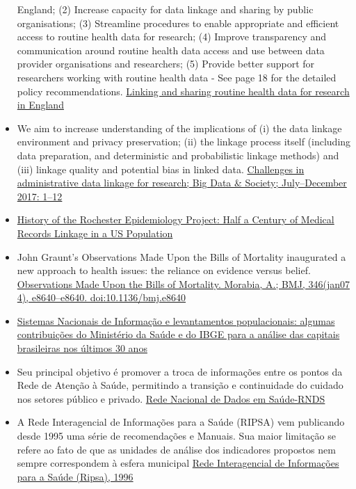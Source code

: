 \documentclass[]{book}
\begin{document}
\begin{itemize}
  England; (2) Increase capacity for data linkage and sharing by public organisations; (3) Streamline procedures to enable appropriate and efficient access to routine health data for research; (4) Improve transparency and communication around routine health data access and use between data provider organisations and researchers; (5) Provide better support for researchers working with routine health data - See page 18 for the detailed policy recommendations. \href{https://www.phgfoundation.org/documents/PHGF-linking-and-sharing-routine-health-data-for-research-in-england.pdf}{Linking and sharing routine health data for research in England}
\item
  We aim to increase understanding of the implications of (i) the data linkage environment and privacy preservation; (ii) the linkage process itself (including data preparation, and deterministic and probabilistic linkage methods) and (iii) linkage quality and potential bias in linked data. \href{https://journals.sagepub.com/doi/pdf/10.1177/2053951717745678}{Challenges in administrative data linkage for research; Big Data \& Society; July--December 2017: 1--12}
\item
  \href{https://sci-hub.tw/10.1016/j.mayocp.2012.08.012}{History of the Rochester Epidemiology Project: Half a Century of Medical Records Linkage in a US Population}
\item
  John Graunt's Observations Made Upon the Bills of Mortality inaugurated a new approach to health issues: the reliance on evidence versus belief. \href{https://sci-hub.tw/10.1136/bmj.e8640}{Observations Made Upon the Bills of Mortality. Morabia, A.; BMJ, 346(jan07 4), e8640--e8640. doi:10.1136/bmj.e8640}
\item
  \href{http://www.scielo.br/pdf/csc/v23n6/1413-8123-csc-23-06-1859.pdf}{Sistemas Nacionais de Informação e levantamentos populacionais: algumas contribuições do Ministério da Saúde e do IBGE para a análise das capitais brasileiras nos últimos 30 anos}
\item
  Seu principal objetivo é promover a troca de informações entre os pontos da Rede de Atenção à Saúde, permitindo a transição e continuidade do cuidado nos setores público e privado. \href{http://datasus.saude.gov.br/uncategorized/ministerio-da-saude-lanca-a-rede-nacional-de-dados-em-saude-e-datasus-realiza-encontro-tecnico/}{Rede Nacional de Dados em Saúde-RNDS}
\item
  A Rede Interagencial de Informações para a Saúde (RIPSA) vem publicando desde 1995 uma série de recomendações e Manuais. Sua maior limitação se refere ao fato de que as unidades de análise dos indicadores propostos nem sempre correspondem à esfera municipal \href{http://www.ripsa.org.br/vhl/metodologia-ripsa/concepcao-e-estruturacao/}{Rede Interagencial de Informações para a Saúde (Ripsa), 1996}

\end{itemize}
\end{document}
